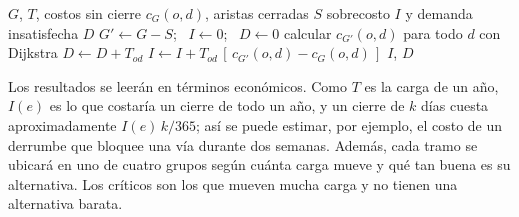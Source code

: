 \documentclass[conference]{IEEEtran}
\begin{document}
\begin{algorithm}[H]
\caption{Simulación del cierre de un conjunto de aristas $S$}
\label{alg:cierres}
\begin{algorithmic}[1]
\Require $G$, $T$, costos sin cierre $c_G(o,d)$, aristas cerradas $S$
\Ensure sobrecosto $I$ y demanda insatisfecha $D$
\State $G' \gets G - S$; \ $I \gets 0$; \ $D \gets 0$
    \State calcular $c_{G'}(o,d)$ para todo $d$ con Dijkstra
            \State $D \gets D + T_{od}$ 
        \Else
            \State $I \gets I + T_{od}\,[\,c_{G'}(o,d)-c_G(o,d)\,]$
        \EndIf
    \EndFor
\EndFor
\State \Return $I$, $D$
\end{algorithmic}
\end{algorithm}

Los resultados se leerán en términos económicos. Como $T$ es la carga de un
año, $I(e)$ es lo que costaría un cierre de todo un año, y un cierre de $k$
días cuesta aproximadamente $I(e)\,k/365$; así se puede estimar, por ejemplo,
el costo de un derrumbe que bloquee una vía durante dos semanas. Además, cada
tramo se ubicará en uno de cuatro grupos según cuánta carga mueve y qué tan
buena es su alternativa. Los críticos son los que mueven mucha carga y no
tienen una alternativa barata.



\end{document}

